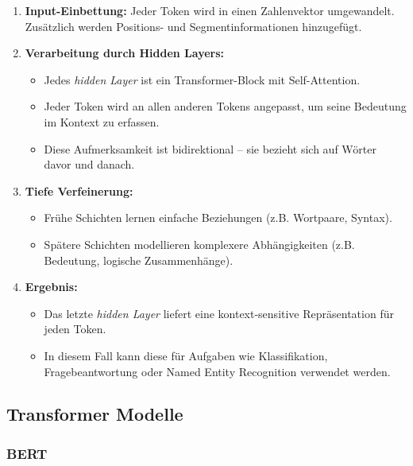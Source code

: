 \begin{enumerate}
    \item \textbf{Input-Einbettung:} Jeder Token wird in einen Zahlenvektor umgewandelt. 
    Zusätzlich werden Positions- und Segmentinformationen hinzugefügt.
    
    \item \textbf{Verarbeitung durch Hidden Layers:} 
    \begin{itemize}
        \item Jedes \textit{hidden Layer} ist ein Transformer-Block mit Self-Attention.
        \item Jeder Token wird an allen anderen Tokens angepasst, um seine Bedeutung im Kontext zu erfassen.
        \item Diese Aufmerksamkeit ist bidirektional – sie bezieht sich auf Wörter davor und danach.
    \end{itemize}
    
    \item \textbf{Tiefe Verfeinerung:} 
    \begin{itemize}
        \item Frühe Schichten lernen einfache Beziehungen (z.B. Wortpaare, Syntax).
        \item Spätere Schichten modellieren komplexere Abhängigkeiten (z.B. Bedeutung, logische Zusammenhänge).
    \end{itemize}
    
    \item \textbf{Ergebnis:} 
    \begin{itemize}
        \item Das letzte \textit{hidden Layer} liefert eine kontext-sensitive Repräsentation für jeden Token.
        \item In diesem Fall kann diese für Aufgaben wie Klassifikation, Fragebeantwortung oder Named Entity Recognition verwendet werden.
    \end{itemize}
\end{enumerate} 


\subsection{Transformer Modelle}
\label{sec:transformer_modelle}

\subsubsection{BERT} \label{sec04:bert}

